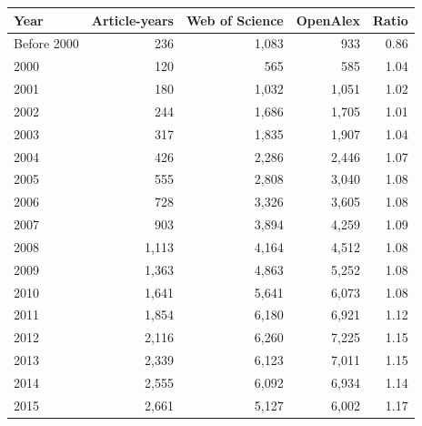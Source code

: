 
\begin{tabular}[t]{lrrrr}
\toprule
Year & Article-years & Web of Science & OpenAlex & Ratio\\
\midrule
Before 2000 & 236 & 1,083 & 933 & 0.86\\
2000 & 120 & 565 & 585 & 1.04\\
2001 & 180 & 1,032 & 1,051 & 1.02\\
2002 & 244 & 1,686 & 1,705 & 1.01\\
2003 & 317 & 1,835 & 1,907 & 1.04\\
2004 & 426 & 2,286 & 2,446 & 1.07\\
2005 & 555 & 2,808 & 3,040 & 1.08\\
2006 & 728 & 3,326 & 3,605 & 1.08\\
2007 & 903 & 3,894 & 4,259 & 1.09\\
2008 & 1,113 & 4,164 & 4,512 & 1.08\\
2009 & 1,363 & 4,863 & 5,252 & 1.08\\
2010 & 1,641 & 5,641 & 6,073 & 1.08\\
2011 & 1,854 & 6,180 & 6,921 & 1.12\\
2012 & 2,116 & 6,260 & 7,225 & 1.15\\
2013 & 2,339 & 6,123 & 7,011 & 1.15\\
2014 & 2,555 & 6,092 & 6,934 & 1.14\\
2015 & 2,661 & 5,127 & 6,002 & 1.17\\
\bottomrule
\end{tabular}
